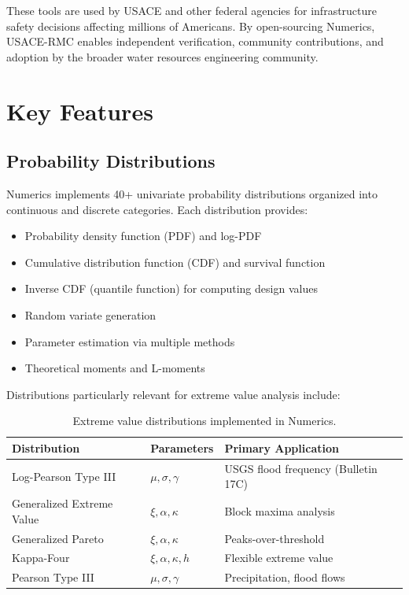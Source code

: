 \documentclass[10pt,a4paper,onecolumn]{article}
\begin{document}
These tools are used by USACE and other federal agencies for infrastructure safety decisions affecting millions of Americans. By open-sourcing Numerics, USACE-RMC enables independent verification, community contributions, and adoption by the broader water resources engineering community.

\section*{Key Features}

\subsection*{Probability Distributions}

Numerics implements 40+ univariate probability distributions organized into continuous and discrete categories. Each distribution provides:

\begin{itemize}
    \item Probability density function (PDF) and log-PDF
    \item Cumulative distribution function (CDF) and survival function
    \item Inverse CDF (quantile function) for computing design values
    \item Random variate generation
    \item Parameter estimation via multiple methods
    \item Theoretical moments and L-moments
\end{itemize}

Distributions particularly relevant for extreme value analysis include:

\begin{table}[h]
\centering
\begin{tabular}{lll}
\hline
\textbf{Distribution} & \textbf{Parameters} & \textbf{Primary Application} \\
\hline
Log-Pearson Type III & $\mu, \sigma, \gamma$ & USGS flood frequency (Bulletin 17C) \\
Generalized Extreme Value & $\xi, \alpha, \kappa$ & Block maxima analysis \\
Generalized Pareto & $\xi, \alpha, \kappa$ & Peaks-over-threshold \\
Kappa-Four & $\xi, \alpha, \kappa, h$ & Flexible extreme value \\
Pearson Type III & $\mu, \sigma, \gamma$ & Precipitation, flood flows \\
\hline
\end{tabular}
\caption{Extreme value distributions implemented in Numerics.}
\end{table}
\end{document}
